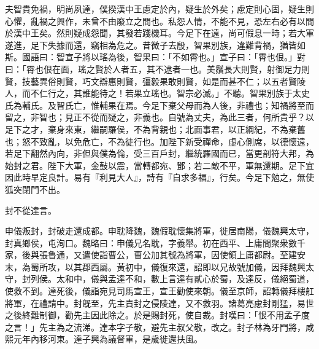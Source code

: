 \begin{pinyinscope}
夫智貴免禍，明尚夙達，僕揆漢中王慮定於內，疑生於外矣；慮定則心固，疑生則心懼，亂禍之興作，未曾不由廢立之間也。私怨人情，不能不見，恐左右必有以間於漢中王矣。然則疑成怨聞，其發若踐機耳。今足下在遠，尚可假息一時；若大軍遂進，足下失據而還，竊相為危之。昔微子去殷，智果別族，違難背禍，猶皆如斯。國語曰：智宣子將以瑤為後，智果曰：「不如霄也。」宣子曰：「霄也佷。」對曰：「霄也佷在面，瑤之賢於人者五，其不逮者一也。美鬚長大則賢，射御足力則賢，技藝異俗則賢，巧文辯惠則賢，彊毅果敢則賢，如是而甚不仁；以五者賢陵人，而不仁行之，其誰能待之！若果立瑤也。智宗必滅。」不聽。智果別族于太史氏為輔氏。及智氏亡，惟輔果在焉。今足下棄父母而為人後，非禮也；知禍將至而留之，非智也；見正不從而疑之，非義也。自號為丈夫，為此三者，何所貴乎？以足下之才，棄身來東，繼嗣羅侯，不為背親也；北面事君，以正綱紀，不為棄舊也；怒不致亂，以免危亡，不為徒行也。加陛下新受禪命，虛心側席，以德懷遠，若足下翻然內向，非但與僕為倫，受三百戶封，繼統羅國而已，當更剖符大邦，為始封之君。陛下大軍，金鼔以震，當轉都宛、鄧；若二敵不平，軍無還期。足下宜因此時早定良計。易有『利見大人』，詩有『自求多福』，行矣。今足下勉之，無使狐突閉門不出。

封不從達言。

申儀叛封，封破走還成都。申耽降魏，魏假耽懷集將軍，徙居南陽，儀魏興太守，封真鄉侯，屯洵口。魏略曰：申儀兄名耽，字義舉。初在西平、上庸間聚衆數千家，後與張魯通，又遣使詣曹公，曹公加其號為將軍，因使領上庸都尉。至建安末，為蜀所攻，以其郡西屬。黃初中，儀復來還，詔即以兄故號加儀，因拜魏興太守，封列侯。太和中，儀與孟達不和，數上言達有貳心於蜀，及達反，儀絕蜀道，使救不到。達死後，儀詣宛見司馬宣王，宣王勸使來朝。儀至京師，詔轉儀拜樓舡將軍，在禮請中。封旣至，先主責封之侵陵達，又不救羽。諸葛亮慮封剛猛，易世之後終難制御，勸先主因此除之。於是賜封死，使自裁。封嘆曰：「恨不用孟子度之言！」先主為之流涕。達本字子敬，避先主叔父敬，改之。封子林為牙門將，咸熙元年內移河東。達子興為議督軍，是歲徙還扶風。


\end{pinyinscope}